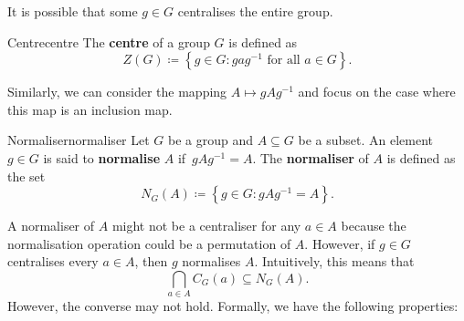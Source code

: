 \documentclass[math]{amznotes}
\theoremstyle{remark}
\newcommand{\0}{\mathbf{0}}
\newcommand{\1}{\mathbf{1}}
\begin{document}
It is possible that some $g \in G$ centralises the entire group.
\begin{dfnbox}{Centre}{centre}
    The {\color{red} \textbf{centre}} of a group $G$ is defined as 
    \begin{equation*}
        Z\left(G\right) \coloneqq \left\{g \in G \colon gag^{-1} \textrm{ for all } a \in G\right\}.
    \end{equation*}
\end{dfnbox}
Similarly, we can consider the mapping $A \mapsto gAg^{-1}$ and focus on the case where this map is an inclusion map.
\begin{dfnbox}{Normaliser}{normaliser}
    Let $G$ be a group and $A \subseteq G$ be a subset. An element $g \in G$ is said to {\color{red} \textbf{normalise}} $A$ if~$gAg^{-1} = A$. The {\color{red} \textbf{normaliser}} of $A$ is defined as the set
    \begin{equation*}
        N_G\left(A\right) \coloneqq \left\{g \in G \colon gAg^{-1} = A\right\}.
    \end{equation*}
\end{dfnbox}
A normaliser of $A$ might not be a centraliser for any $a \in A$ because the normalisation operation could be a permutation of $A$. However, if $g \in G$ centralises every $a \in A$, then $g$ normalises $A$. Intuitively, this means that 
\begin{equation*}
    \bigcap_{a \in A}C_G\left(a\right) \subseteq N_G\left(A\right).
\end{equation*}
However, the converse may not hold. Formally, we have the following properties:
\end{document}
